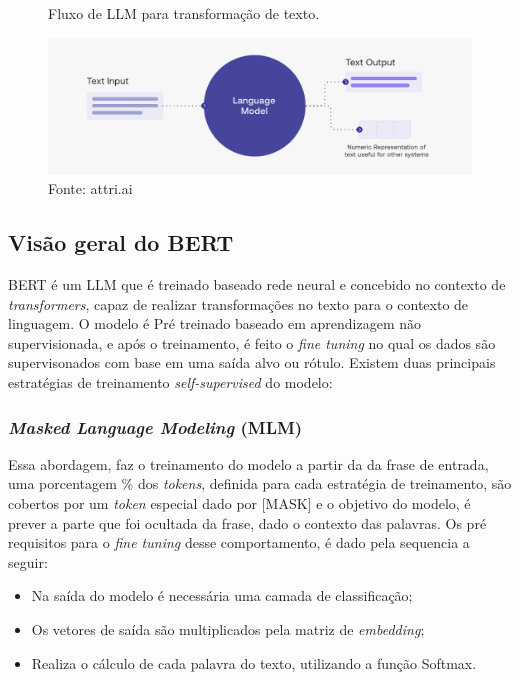 \begin{figure}[H]
    \centering
    \caption{Fluxo de LLM para transformação de texto.}
    \includegraphics[width=\linewidth]{img/BERT/bert1.png}
    \caption*{ Fonte: attri.ai \cite{Attri2024}}
    \label{fig:bert1}
\end{figure}

\subsection{Visão geral do BERT}

BERT é um LLM  que é treinado baseado rede neural e concebido no contexto de \textit{transformers}, capaz de realizar transformações no texto para o contexto de linguagem. O modelo é Pré treinado baseado em aprendizagem não supervisionada, e após o treinamento, é feito o\textit{ fine tuning} no qual os dados são supervisonados com base em 
 uma saída alvo ou rótulo. Existem duas principais estratégias de treinamento \textit{self-supervised} do modelo:
 
\subsubsection{\textit{Masked Language Modeling} (MLM)}
Essa abordagem, faz o treinamento do modelo a partir da  da frase de entrada, uma porcentagem \% dos \textit{tokens}, definida para cada estratégia de treinamento,  são cobertos por um \textit{token} especial dado por [MASK] e o objetivo do modelo, é prever a parte que foi ocultada da frase, dado o contexto das palavras. Os pré requisitos para o \textit{fine tuning} desse comportamento, é dado pela sequencia a seguir: 

\begin{itemize}
    \item Na saída do modelo é necessária uma camada de classificação;
    \item Os vetores de saída são multiplicados pela matriz de \textit{embedding};
    \item Realiza o cálculo de cada palavra do texto, utilizando a função Softmax.
\end{itemize}

